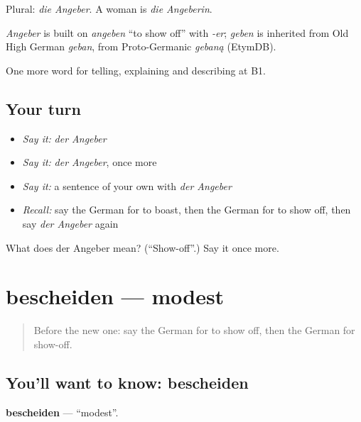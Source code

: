 Plural: \emph{die Angeber}. A woman is \emph{die Angeberin}.

\begin{cousinweb}
\emph{Angeber} is built on \emph{angeben} \textquotedblleft{}to show off\textquotedblright{} with \emph{-er}; \emph{geben} is inherited from Old High German \emph{geban}, from Proto-Germanic \emph{gebaną} (EtymDB).
\end{cousinweb}

\begin{grammarlens}[title={What you've built}]
One more word for telling, explaining and describing at B1.
\end{grammarlens}

\subsection*{Your turn}
\begin{itemize}
\raggedright
  \item \emph{Say it:} \emph{der Angeber}
  \item \emph{Say it:} \emph{der Angeber}, once more
  \item \emph{Say it:} a sentence of your own with \emph{der Angeber}
  \item \emph{Recall:} say the German for to boast, then the German for to show off, then say \emph{der Angeber} again
\end{itemize}

\begin{tcolorbox}[breakable,colback=teal!4,colframe=teal!35!black,title={Before you move on}]
What does der Angeber mean? (\textquotedblleft{}Show-off\textquotedblright{}.) Say it once more.
\end{tcolorbox}
\section[bescheiden]{bescheiden — modest}

\label{lesson:GE-C475-bescheiden}



\begin{quote}
Before the new one: say the German for to show off, then the German for show-off.
\end{quote}

\subsection*{You'll want to know: bescheiden}
\textbf{bescheiden} — \textquotedblleft{}modest\textquotedblright{}.

